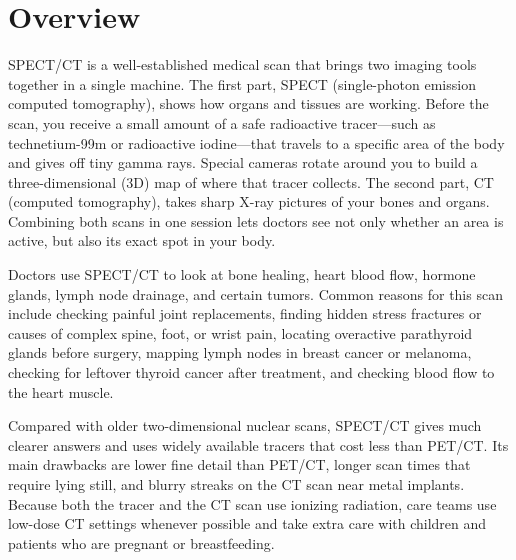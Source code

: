 \label{ch:infographic-spect-ct}

\section{Overview}

SPECT/CT is a well-established medical scan that brings two imaging tools together in a single machine. The first part, SPECT (single-photon emission computed tomography), shows how organs and tissues are working. Before the scan, you receive a small amount of a safe radioactive tracer---such as technetium-99m or radioactive iodine---that travels to a specific area of the body and gives off tiny gamma rays. Special cameras rotate around you to build a three-dimensional (3D) map of where that tracer collects. The second part, CT (computed tomography), takes sharp X-ray pictures of your bones and organs. Combining both scans in one session lets doctors see not only whether an area is active, but also its exact spot in your body.

Doctors use SPECT/CT to look at bone healing, heart blood flow, hormone glands, lymph node drainage, and certain tumors. Common reasons for this scan include checking painful joint replacements, finding hidden stress fractures or causes of complex spine, foot, or wrist pain, locating overactive parathyroid glands before surgery, mapping lymph nodes in breast cancer or melanoma, checking for leftover thyroid cancer after treatment, and checking blood flow to the heart muscle.

Compared with older two-dimensional nuclear scans, SPECT/CT gives much clearer answers and uses widely available tracers that cost less than PET/CT. Its main drawbacks are lower fine detail than PET/CT, longer scan times that require lying still, and blurry streaks on the CT scan near metal implants. Because both the tracer and the CT scan use ionizing radiation, care teams use low-dose CT settings whenever possible and take extra care with children and patients who are pregnant or breastfeeding.

